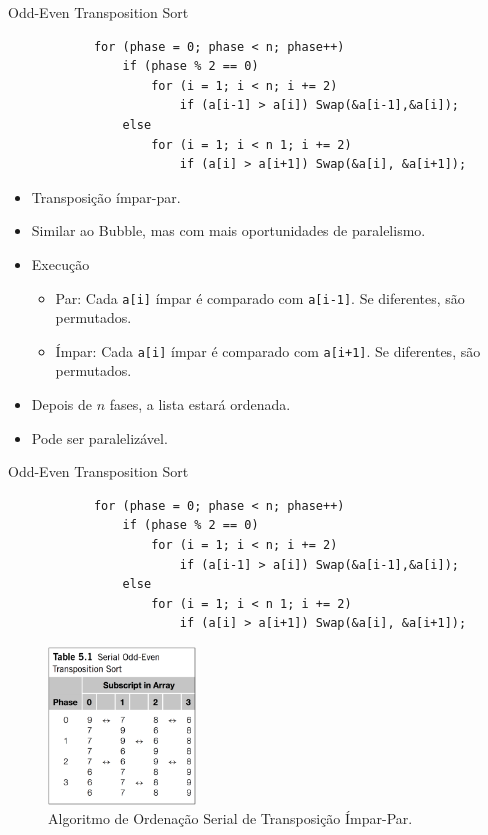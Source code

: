 	\begin{frame}[fragile]{Odd-Even Transposition Sort }
		\begin{verbatim}
			for (phase = 0; phase < n; phase++) 
				if (phase % 2 == 0)
					for (i = 1; i < n; i += 2)
						if (a[i-1] > a[i]) Swap(&a[i-1],&a[i]); 
				else
					for (i = 1; i < n 1; i += 2)
						if (a[i] > a[i+1]) Swap(&a[i], &a[i+1]);
		\end{verbatim}
		\begin{itemize}
			\item Transposição ímpar-par.
			\item Similar ao Bubble, mas com mais oportunidades de paralelismo.
			\item Execução
			\begin{itemize}
				\item Par: Cada {\tt a[i]} ímpar é comparado com {\tt a[i-1]}. Se diferentes, são permutados.
				\item Ímpar: Cada {\tt a[i]} ímpar é comparado com {\tt a[i+1]}. Se diferentes, são permutados.
			\end{itemize}
			\item Depois de $n$ fases, a lista estará ordenada.
			\item Pode ser paralelizável.
		\end{itemize}
\end{frame}

	\begin{frame}[fragile]{Odd-Even Transposition Sort }
		\begin{multicols}{2}
			\begin{verbatim}
			for (phase = 0; phase < n; phase++) 
				if (phase % 2 == 0)
					for (i = 1; i < n; i += 2)
						if (a[i-1] > a[i]) Swap(&a[i-1],&a[i]); 
				else
					for (i = 1; i < n 1; i += 2)
						if (a[i] > a[i+1]) Swap(&a[i], &a[i+1]);
			\end{verbatim}
		\columnbreak
			\begin{figure}[p]
				\centering
				\includegraphics[width=0.35\textwidth]{img/pacheco/odd-even.png}
				\caption{Algoritmo de Ordenação Serial de Transposição Ímpar-Par.}
			\end{figure}
		\end{multicols}
\end{frame}


